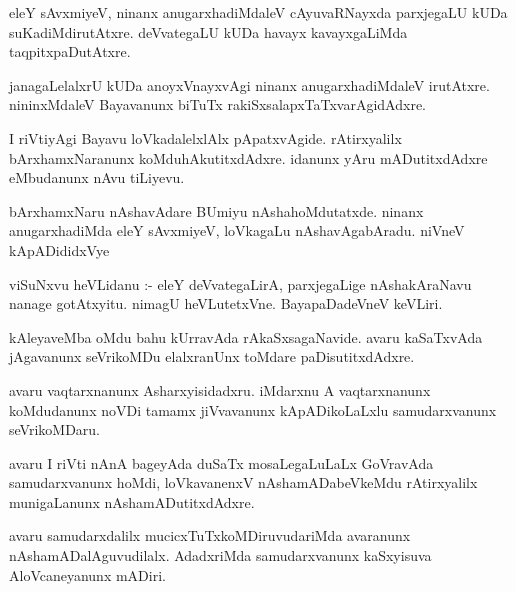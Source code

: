 \documentclass{article}
\begin{document}
\begin{mn}
eleY  sAvxmiyeV,  ninanx  anugarxhadiMdaleV  cAyuvaRNayxda  parxjegaLU  kUDa  suKadiMdirutAtxre.  
deVvategaLU  kUDa  havayx kavayxgaLiMda  taqpitxpaDutAtxre.
\end{mn}

\begin{mn}
janagaLelalxrU  kUDa  anoyxVnayxvAgi  ninanx  anugarxhadiMdaleV  irutAtxre.  nininxMdaleV  
Bayavanunx  biTuTx  rakiSxsalapxTaTxvarAgidAdxre.
\end{mn}

\begin{mn}
I riVtiyAgi  Bayavu  loVkadalelxlAlx  pApatxvAgide.  rAtirxyalilx  bArxhamxNaranunx  
koMduhAkutitxdAdxre.  idanunx  yAru  mADutitxdAdxre  eMbudanunx  nAvu  tiLiyevu.
\end{mn}

\begin{mn}
bArxhamxNaru  nAshavAdare  BUmiyu  nAshahoMdutatxde.  ninanx  anugarxhadiMda  eleY  
sAvxmiyeV,  loVkagaLu  nAshavAgabAradu.  niVneV  kApADididxVye
\end{mn}

\begin{mn}
viSuNxvu  heVLidanu :- eleY  deVvategaLirA,  parxjegaLige  nAshakAraNavu  nanage  
gotAtxyitu.  nimagU  heVLutetxVne.  BayapaDadeVneV  keVLiri.
\end{mn}

\begin{mn}
kAleyaveMba  oMdu  bahu  kUrravAda  rAkaSxsagaNavide.  avaru  kaSaTxvAda  jAgavanunx  
seVrikoMDu  elalxranUnx  toMdare paDisutitxdAdxre.
\end{mn}

\begin{mn}
avaru  vaqtarxnanunx  Asharxyisidadxru.  iMdarxnu  A  vaqtarxnanunx  koMdudanunx  
noVDi  tamamx  jiVvavanunx  kApADikoLaLxlu  samudarxvanunx  seVrikoMDaru.
\end{mn}

\begin{mn}
avaru I riVti nAnA  bageyAda  duSaTx  mosaLegaLuLaLx  GoVravAda  samudarxvanunx  hoMdi,  
loVkavanenxV  nAshamADabeVkeMdu  rAtirxyalilx  munigaLanunx  nAshamADutitxdAdxre.
\end{mn}

\begin{mn}
avaru  samudarxdalilx  mucicxTuTxkoMDiruvudariMda  avaranunx  nAshamADalAguvudilalx.  
AdadxriMda  samudarxvanunx  kaSxyisuva  AloVcaneyanunx  mADiri.
\end{mn}
\end{document}
